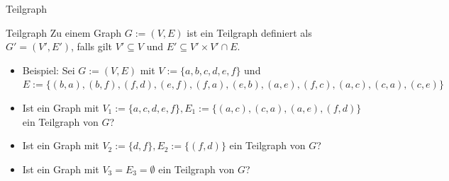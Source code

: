 \documentclass[handout]{beamer}
\begin{document}
\begin{frame}{Teilgraph}
	\begin{block}{Teilgraph}
		\ip Zu einem Graph $G := (V, E)$ ist ein Teilgraph definiert als $G' = (V', E')$, falls gilt $V' \subseteq V$ und $E' \subseteq V' \times V' \cap E$.
	\end{block}

	\bp	

	\begin{itemize}
		\item Beispiel: Sei $G := (V,E)$ mit $V := \{a,b,c,d,e,f\}$ und $E := \{(b,a),(b,f),(f,d),(e,f),(f,a),(e,b),(a,e),(f,c),(a,c),(c,a),(c,e)\}$
		\p\item Ist ein Graph mit $V_1:=\{a,c,d,e,f\}, E_1:= \{(a,c),(c,a),(a,e),(f,d)\}$ ein Teilgraph von $G$?
		\p\item Ist ein Graph mit $V_2:=\{d,f\}, E_2:= \{(f,d)\}$ ein Teilgraph von $G$?
		\p\item Ist ein Graph mit $V_3=E_3=\emptyset$ ein Teilgraph von $G$?
	\end{itemize}

	\bp
	

\end{frame}
\end{document}
